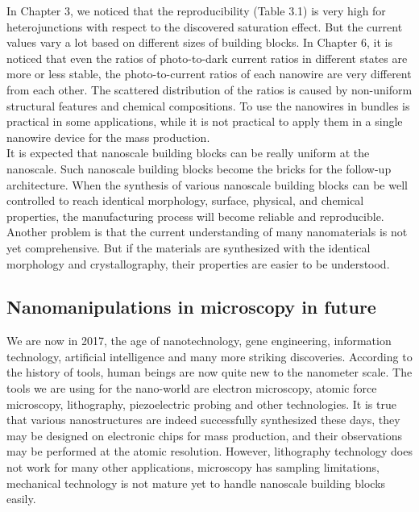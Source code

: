 In Chapter 3, we noticed that the reproducibility (Table 3.1) is very high for heterojunctions with respect to the discovered saturation effect. 
But the current values vary a lot based on different sizes of building blocks. 
In Chapter 6, it is noticed that even the ratios of photo-to-dark current ratios in different states are more or less stable, the photo-to-current ratios of each nanowire are very different from each other. 
The scattered distribution of the ratios is caused by non-uniform structural features and chemical compositions. 
To use the nanowires in bundles is practical in some applications, while it is not practical to apply them in a single nanowire device for the mass production. \\

It is expected that nanoscale building blocks can be really uniform at the nanoscale. Such nanoscale building blocks become the bricks for the follow-up architecture. When the synthesis of various nanoscale building blocks can be well controlled to reach identical morphology, surface, physical, and chemical properties, the manufacturing process will become reliable and reproducible. \\

Another problem is that the current understanding of many nanomaterials is not yet comprehensive. But if the materials are synthesized with the identical morphology and crystallography, their properties are easier to be understood. 

\subsection{Nanomanipulations in microscopy in future}
We are now in 2017, the age of nanotechnology, gene engineering, information technology, artificial intelligence and many more striking discoveries. According to the history of tools, human beings are now quite new to the nanometer scale. The tools we are using for the nano-world are electron microscopy, atomic force microscopy, lithography, piezoelectric probing and other technologies. It is true that various nanostructures are indeed successfully synthesized these days, they may be designed on electronic chips for mass production, and their observations may be performed at the atomic resolution. However, lithography technology does not work for many other applications, microscopy has sampling limitations, mechanical technology is not mature yet to handle nanoscale building blocks easily. 

